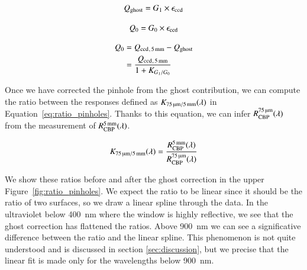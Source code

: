 \begin{equation}
    Q_{\mathrm{ghost}} = G_1 \times \epsilon_{\mathrm{ccd}}
    \label{eq:qghost}
\end{equation}

\begin{equation}
    Q_0 = G_0 \times \epsilon_{\mathrm{ccd}}
    \label{eq:qmain}
\end{equation}

\begin{equation}
\begin{aligned}
    Q_0 & = Q_{\mathrm{ccd}}{}_{, \, \SI{5}{\milli\meter}} - Q_{\mathrm{ghost}} \\
    & = \frac{Q_{\mathrm{ccd}}{}_{, \, \SI{5}{\milli\meter}}}{1 + K_{G_1/G_0}}
    \label{eq:qccd_5mm}
\end{aligned}
\end{equation}

Once we have corrected the \bpinhole pinhole from the ghost contribution, we can compute the ratio between the \SD responses defined as $K_\mathrm{\SI{75}{\micro\meter}/\SI{5}{\milli\meter}}(\lambda)$ in Equation~\ref{eq:ratio_pinholes}. Thanks to this equation, we can infer $R_{\mathrm{CBP}}^{\SI{75}{\micro\meter}}(\lambda)$ from the measurement of $R_{\mathrm{CBP}}^{\SI{5}{\milli\meter}}(\lambda)$.

\begin{equation}
    K_\mathrm{\SI{75}{\micro\meter}/\SI{5}{\milli\meter}}(\lambda) = \frac{R_{\mathrm{CBP}}^{\SI{5}{\milli\meter}}(\lambda)}{R_{\mathrm{CBP}}^{\SI{75}{\micro\meter}}(\lambda)}
    \label{eq:ratio_pinholes}
\end{equation}

We show these ratios before and after the ghost correction in the upper Figure~\ref{fig:ratio_pinholes}. We expect the ratio to be linear since it should be the ratio of two surfaces, so we draw a linear spline through the data. In the ultraviolet below \SI{400}{\nm} where the window is highly reflective, we see that the ghost correction has flattened the ratios. Above \SI{900}{\nm} we can see a significative difference between the ratio and the linear spline. This phenomenon is not quite understood and is discussed in section \ref{sec:discussion}, but we precise that the linear fit is made only for the wavelengths below \SI{900}{\nano\meter}. 

